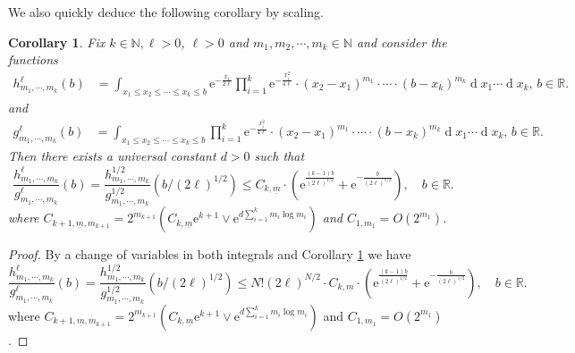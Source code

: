 \documentclass[11pt, reqno]{amsart}
\numberwithin{equation}{section}
\newcounter{dummy} \numberwithin{dummy}{section}
\newtheorem{corollary}[dummy]{Corollary}
\newcommand{\N}{\ensuremath{\mathbb{N}}}
\newcommand{\R}{\ensuremath{\mathbb{R}}}
\newcommand{\diff}{\ensuremath{\operatorname{d}\!}}
\begin{document}
We also quickly deduce the following corollary by scaling. 
\begin{corollary}\label{cor: 1 int estimates}
      Fix $k\in \N, \ell> 0$, $\ell>0$ and $m_1, m_2, \cdots, m_k \in \N$ and consider the functions
    \begin{equation*}
        \begin{array}{rr}
            h^\ell_{m_1, \cdots, m_k}(b) &= \displaystyle\int_{x_1\le x_2\le \cdots\le x_k\le b}\mathrm{e}^{-\frac{x_1}{2\ell}}\prod_{i=1}^{k}\mathrm{e}^{-\frac{x_i^2}{4\ell}}\cdot(x_2-x_1)^{m_1}\cdot \cdots \cdot (b-x_k)^{m_k}\diff x_1\cdots \diff x_{k},\, b\in \R.
        \end{array}
    \end{equation*}
    and 
    \begin{equation*}
        \begin{array}{rr}
            g^{\ell}_{m_1, \cdots, m_k}(b) &= \displaystyle\int_{x_1\le x_2\le \cdots\le x_k\le b}\prod_{i=1}^{k}\mathrm{e}^{-\frac{x_i^2}{4\ell}}\cdot(x_2-x_1)^{m_1}\cdot \cdots \cdot (b-x_k)^{m_k}\diff x_1\cdots \diff x_{k},\, b\in \R.
        \end{array}
    \end{equation*}
    Then there exists a universal constant $d>0$ such that 
    \[
     \frac{h^{\ell}_{m_1, \cdots, m_k}}{g^{\ell}_{m_1, \cdots, m_k}}(b)=\frac{h^{1/2}_{m_1, \cdots, m_k}}{g^{1/2}_{m_1, \cdots, m_k}}(b/(2\ell)^{1/2}) \le  C_{k,\underline{m}} \cdot \left(\mathrm{e}^{\frac{(k-1)b}{(2\ell)^{1/2}}}+\mathrm{e}^{-\frac{b}{(2\ell)^{1/2}}}\right), \quad b\in \R.
    \]
    where $C_{k+1, \underline{m},m_{k+1}} = 2^{m_{k+1}}(C_{k,\underline{m}}\mathrm{e}^{k+1}\lor \mathrm{e}^{d\sum_{i=1}^k m_i\log m_i})$ and $C_{1, m_1} = O(2^{m_1})$.
\end{corollary}

\begin{proof}
    By a change of variables in both integrals and Corollary \ref{cor: 1 int estimates} we have 
    \[
     \frac{h^{\ell}_{m_1, \cdots, m_k}}{g^{\ell}_{m_1, \cdots, m_k}}(b)=\frac{h^{1/2}_{m_1, \cdots, m_k}}{g^{1/2}_{m_1, \cdots, m_k}}(b/(2\ell)^{1/2}) \le  N!(2\ell)^{N/2} \cdot C_{k,\underline{m}} \cdot \left( \mathrm{e}^{\frac{(k-1)b}{(2\ell)^{1/2}}}+\mathrm{e}^{-\frac{b}{(2\ell)^{1/2}}}\right), \quad b\in \R.
    \]
    where $C_{k+1, \underline{m},m_{k+1}} = 2^{m_{k+1}}(C_{k,\underline{m}}\mathrm{e}^{k+1}\lor \mathrm{e}^{d\sum_{i=1}^k m_i\log m_i})$ and $C_{1, m_1} = O(2^{m_1})$.
\end{proof}
\end{document}
